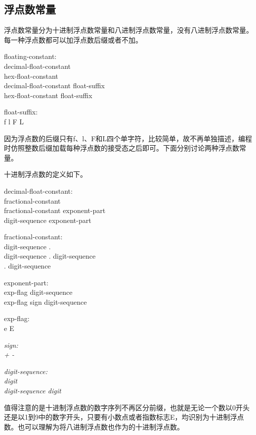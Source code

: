 \documentclass[UTF8, twoside, titlepage]{ctexart}
\newenvironment{lex}
{
	\linespread{1.2}
	\leftskip=2.5cm
	\rightskip=2.5cm
	\itshape
	\setlength{\parindent}{-1cm}
}
{\par}
\begin{document}
\subsection{浮点数常量}
浮点数常量分为十进制浮点数常量和八进制浮点数常量，没有八进制浮点数常量。每一种浮点数都可以加浮点数后缀或者不加。

\begin{lex}
floating-constant:\\
	decimal-float-constant \\
	hex-float-constant \\
	decimal-float-constant float-suffix \\
	hex-float-constant float-suffix
	
float-suffix: \\
{
	\normalfont
	\ttfamily
	f l F L
}
\end{lex}

因为浮点数的后缀只有f、l、F和L四个单字符，比较简单，故不再单独描述，编程时仿照整数后缀加载每种浮点数的接受态之后即可。下面分别讨论两种浮点数常量。

十进制浮点数的定义如下。

\begin{lex}
decimal-float-constant:\\ 
	fractional-constant \\
    fractional-constant exponent-part \\
    digit-sequence exponent-part 
    
fractional-constant:\\
	digit-sequence . \\
	digit-sequence . digit-sequence \\
	. digit-sequence 
	
exponent-part:\\
	exp-flag digit-sequence \\
	exp-flag sign digit-sequence 
	
exp-flag: \\
{
	\normalfont
	\ttfamily
	e E
}

\itshape
sign: \\
{
	\normalfont
	\ttfamily
	+ -
}

\itshape
digit-sequence: \\
	digit \\
	digit-sequence digit
\end{lex}

值得注意的是十进制浮点数的数字序列不再区分前缀，也就是无论一个数以0开头还是以1到9中的数字开头，只要有小数点或者指数标志E，均识别为十进制浮点数。也可以理解为将八进制浮点数也作为的十进制浮点数。
\end{document}
